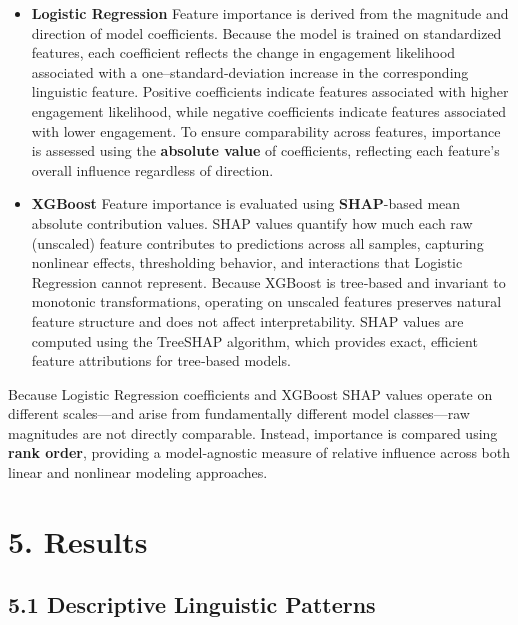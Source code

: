 \begin{itemize}

\item \textbf{Logistic Regression}  
Feature importance is derived from the magnitude and direction of model coefficients. Because the model is trained on standardized features, each coefficient reflects the change in engagement likelihood associated with a one–standard‑deviation increase in the corresponding linguistic feature. Positive coefficients indicate features associated with higher engagement likelihood, while negative coefficients indicate features associated with lower engagement. To ensure comparability across features, importance is assessed using the \textbf{absolute value} of coefficients, reflecting each feature’s overall influence regardless of direction. 

\item \textbf{XGBoost}  
Feature importance is evaluated using \textbf{SHAP}-based mean absolute contribution values. SHAP values quantify how much each raw (unscaled) feature contributes to predictions across all samples, capturing nonlinear effects, thresholding behavior, and interactions that Logistic Regression cannot represent. Because XGBoost is tree‑based and invariant to monotonic transformations, operating on unscaled features preserves natural feature structure and does not affect interpretability. SHAP values are computed using the TreeSHAP algorithm, which provides exact, efficient feature attributions for tree‑based models.

\end{itemize}

Because Logistic Regression coefficients and XGBoost SHAP values operate
on different scales---and arise from fundamentally different model
classes---raw magnitudes are not directly comparable. Instead,
importance is compared using \textbf{rank order}, providing a
model‑agnostic measure of relative influence across both linear and
nonlinear modeling approaches.

\hypertarget{results}{%
\section{5. Results}\label{results}}

\hypertarget{descriptive-linguistic-patterns}{%
\subsection{5.1 Descriptive Linguistic
Patterns}\label{descriptive-linguistic-patterns}}

